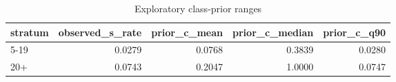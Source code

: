 \begin{table}
\caption{Exploratory class-prior ranges}
\label{tab:tab_pu_priors}
\begin{tabular}{lrrrr}
\toprule
stratum & observed\_s\_rate & prior\_c\_mean & prior\_c\_median & prior\_c\_q90 \\
\midrule
5-19 & 0.0279 & 0.0768 & 0.3839 & 0.0280 \\
20+ & 0.0743 & 0.2047 & 1.0000 & 0.0747 \\
\bottomrule
\end{tabular}
\end{table}
